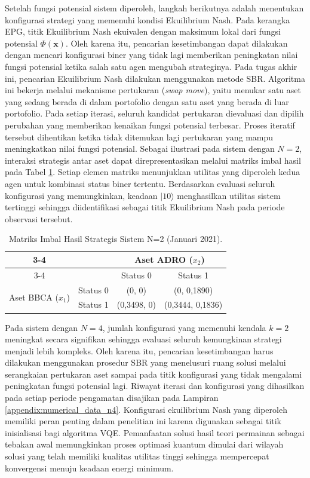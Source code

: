 Setelah fungsi potensial sistem diperoleh, langkah berikutnya adalah menentukan konfigurasi strategi yang memenuhi kondisi Ekuilibrium Nash. Pada kerangka EPG, titik Ekuilibrium Nash ekuivalen dengan maksimum lokal dari fungsi potensial \(\Phi(\mathbf{x})\). Oleh karena itu, pencarian kesetimbangan dapat dilakukan dengan mencari konfigurasi biner yang tidak lagi memberikan peningkatan nilai fungsi potensial ketika salah satu agen mengubah strateginya. Pada tugas akhir ini, pencarian Ekuilibrium Nash dilakukan menggunakan metode SBR. Algoritma ini bekerja melalui mekanisme pertukaran (\textit{swap move}), yaitu menukar satu aset yang sedang berada di dalam portofolio dengan satu aset yang berada di luar portofolio. Pada setiap iterasi, seluruh kandidat pertukaran dievaluasi dan dipilih perubahan yang memberikan kenaikan fungsi potensial terbesar. Proses iteratif tersebut dihentikan ketika tidak ditemukan lagi pertukaran yang mampu meningkatkan nilai fungsi potensial. Sebagai ilustrasi pada sistem dengan \(N=2\), interaksi strategis antar aset dapat direpresentasikan melalui matriks imbal hasil pada Tabel \ref{tab:payoff_n2}. Setiap elemen matriks menunjukkan utilitas yang diperoleh kedua agen untuk kombinasi status biner tertentu. Berdasarkan evaluasi seluruh konfigurasi yang memungkinkan, keadaan \(|10\rangle\) menghasilkan utilitas sistem tertinggi sehingga diidentifikasi sebagai titik Ekuilibrium Nash pada periode observasi tersebut.
\begin{table}[!htbp]
    \centering
    \caption{Matriks Imbal Hasil Strategis Sistem N=2 (Januari 2021).}
    \label{tab:payoff_n2}
    \begin{tabular}{cc|c|c|}
    \cline{3-4}
    & & \multicolumn{2}{c|}{Aset ADRO ($x_2$)} \\ \cline{3-4}
    & & Status 0 & Status 1 \\ \hline
    \multicolumn{1}{|c|}{\multirow{2}{*}{Aset BBCA ($x_1$)}} & Status 0 & (0, 0) & (0, 0,1890) \\ \cline{2-4} 
    \multicolumn{1}{|c|}{} & Status 1 & (0,3498, 0) & (0,3444, 0,1836) \\ \hline
    \end{tabular}
\end{table}

Pada sistem dengan \(N=4\), jumlah konfigurasi yang memenuhi kendala \(k=2\) meningkat secara signifikan sehingga evaluasi seluruh kemungkinan strategi menjadi lebih kompleks. Oleh karena itu, pencarian kesetimbangan harus dilakukan menggunakan prosedur SBR yang menelusuri ruang solusi melalui serangkaian pertukaran aset sampai pada titik konfigurasi yang tidak mengalami peningkatan fungsi potensial lagi. Riwayat iterasi dan konfigurasi yang dihasilkan pada setiap periode pengamatan disajikan pada Lampiran \ref{appendix:numerical_data_n4}. Konfigurasi ekuilibrium Nash yang diperoleh memiliki peran penting dalam penelitian ini karena digunakan sebagai titik inisialisasi bagi algoritma VQE. Pemanfaatan solusi hasil teori permainan sebagai tebakan awal memungkinkan proses optimasi kuantum dimulai dari wilayah solusi yang telah memiliki kualitas utilitas tinggi sehingga mempercepat konvergensi menuju keadaan energi minimum.

